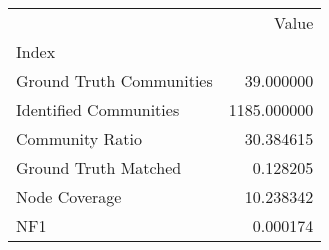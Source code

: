\begin{tabular}{lr}
\toprule
{} &        Value \\
Index                    &              \\
\midrule
Ground Truth Communities &    39.000000 \\
Identified Communities   &  1185.000000 \\
Community Ratio          &    30.384615 \\
Ground Truth Matched     &     0.128205 \\
Node Coverage            &    10.238342 \\
NF1                      &     0.000174 \\
\bottomrule
\end{tabular}
